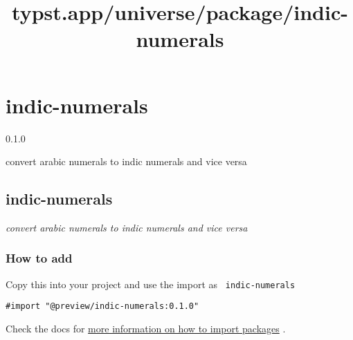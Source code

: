 \title{typst.app/universe/package/indic-numerals}

\label{banner}
\section{indic-numerals}\label{indic-numerals}

{ 0.1.0 }

convert arabic numerals to indic numerals and vice versa

\label{readme}
\href{https://github.com/cecoeco/indic-numerals/blob/main/LICENSE.md}{\pandocbounded{}}

\subsection{indic-numerals}\label{indic-numerals-1}

\emph{convert arabic numerals to indic numerals and vice versa}

\begin{Shaded}
\begin{Highlighting}[]


\end{Highlighting}
\end{Shaded}

\subsubsection{How to add}\label{how-to-add}

Copy this into your project and use the import as
\texttt{\ indic-numerals\ }

\begin{verbatim}
#import "@preview/indic-numerals:0.1.0"
\end{verbatim}



Check the docs for
\href{https://typst.app/docs/reference/scripting/\#packages}{more
information on how to import packages} .

